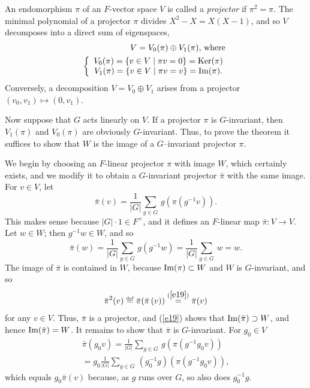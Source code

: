 \documentclass[a4paper,11pt,final]{memoir}%
\theoremstyle{nonumberplain}
\begin{document}
An endomorphism $\pi$ of an $F$-vector space $V$ is called a%
\emph{projector} if $\pi^{2}=\pi$. The minimal polynomial of a projector $\pi$
divides $X^{2}-X=X(X-1)$, and so $V$ decomposes into a direct sum of
eigenspaces,%
\begin{align*}
V=V_{0}(\pi)\oplus V_{1}(\pi) \text{, where }\\
\left\{
\begin{array}
[c]{c}%
V_{0}(\pi)=\{v\in V\mid\pi v=0\}=\Ker(\pi)\\
V_{1}(\pi)=\{v\in V\mid\pi v=v\}=\im(\pi).
\end{array}
\right.
\end{align*}
Conversely, a decomposition $V=V_{0}\oplus V_{1}$ arises from a projector
$(v_{0},v_{1})\mapsto(0,v_{1})$.

Now suppose that $G$ acts linearly on $V$. If a projector $\pi$ is
$G$-invariant, then $V_{1}(\pi)$ and $V_{0}(\pi)$ are obviously $G$-invariant.
Thus, to prove the theorem it suffices to show that $W$ is the image of a
$G$--invariant projector $\pi$.

We begin by choosing an $F$-linear projector $\pi$ with image $W$, which
certainly exists, and we modify it to obtain a $G$-invariant projector
$\bar{\pi}$ with the same image. For $v\in V$, let%
\[
\bar{\pi}(v)=\frac{1}{|G|}\sum_{g\in G}\,g\left(  \pi(g^{-1}v)\right)  .
\]
This makes sense because $|G|\cdot1\in F^{\times}$, and it defines an
$F$-linear map $\bar{\pi}\colon V\rightarrow V$. Let $w\in W$; then
$g^{-1}w\in W$, and so%
\begin{equation}
\bar{\pi}(w)=\frac{1}{|G|}\sum_{g\in G}\,g(g^{-1}w)=\frac{1}{|G|}\sum_{g\in
G}\,w=w. \label{e19}%
\end{equation}
The image of $\bar{\pi}$ is contained in $W$, because $\operatorname{Im}(\pi)\subset W$ and
$W$ is $G$-invariant, and so
\[
\bar{\pi}^{2}(v)\overset{\df}{=}\bar{\pi}(\bar{\pi}\left(
v)\right)  \overset{(\ref{e19})}{=}\bar{\pi}(v)
\]
for any $v\in V$. Thus, $\bar{\pi}$ is a projector, and (\ref{e19}) shows that
$\operatorname{Im}(\bar{\pi})\supset W$, and hence $\operatorname{Im}(\bar{\pi})=W$. It remains to show
that $\bar{\pi}$ is $G$-invariant. For $g_{0}\in V$
\begin{align*}
\bar{\pi}(g_{0}v)=\frac{1}{|G|}\sum_{g\in G}\,g\left(  \pi(g^{-1}%
g_{0}v)\right)  \\
=g_{0}\frac{1}{|G|}\sum_{g\in G}\,(g_{0}^{-1}g)\left(
\pi(g^{-1}g_{0}v)\right)  ,
\end{align*}
which equals $g_{0}\bar{\pi}\left(  v\right)  $ because, as $g$ runs over $G$,
so also does $g_{0}^{-1}g$.
\end{document}
